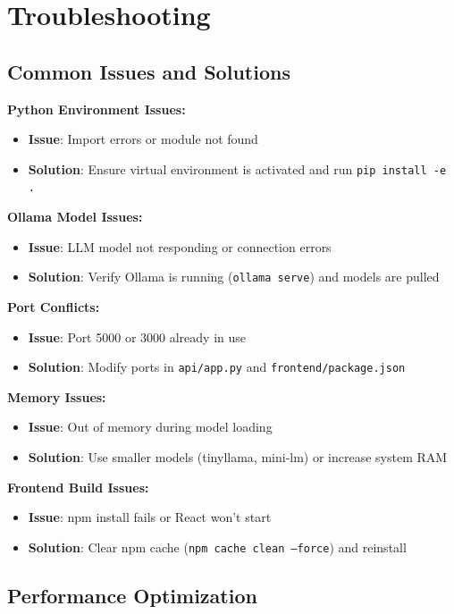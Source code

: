 \section{Troubleshooting}

\subsection{Common Issues and Solutions}

\textbf{Python Environment Issues:}
\begin{itemize}
    \item \textbf{Issue}: Import errors or module not found
    \item \textbf{Solution}: Ensure virtual environment is activated and run \texttt{pip install -e .}
\end{itemize}

\textbf{Ollama Model Issues:}
\begin{itemize}
    \item \textbf{Issue}: LLM model not responding or connection errors
    \item \textbf{Solution}: Verify Ollama is running (\texttt{ollama serve}) and models are pulled
\end{itemize}

\textbf{Port Conflicts:}
\begin{itemize}
    \item \textbf{Issue}: Port 5000 or 3000 already in use
    \item \textbf{Solution}: Modify ports in \texttt{api/app.py} and \texttt{frontend/package.json}
\end{itemize}

\textbf{Memory Issues:}
\begin{itemize}
    \item \textbf{Issue}: Out of memory during model loading
    \item \textbf{Solution}: Use smaller models (tinyllama, mini-lm) or increase system RAM
\end{itemize}

\textbf{Frontend Build Issues:}
\begin{itemize}
    \item \textbf{Issue}: npm install fails or React won't start
    \item \textbf{Solution}: Clear npm cache (\texttt{npm cache clean --force}) and reinstall
\end{itemize}

\subsection{Performance Optimization}

